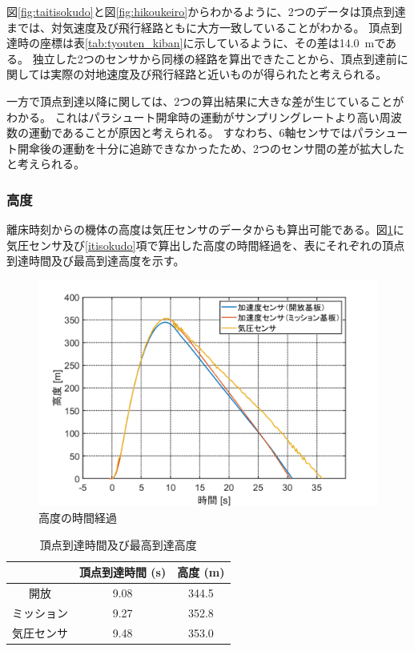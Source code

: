 \documentclass[a4paper,11pt,titlepage,uplatex]{jsarticle}
\begin{document}
図\ref{fig:taitisokudo}と図\ref{fig:hikoukeiro}からわかるように、2つのデータは頂点到達までは、対気速度及び飛行経路ともに大方一致していることがわかる。
頂点到達時の座標は表\ref{tab:tyouten_kiban}に示しているように、その差は\SI{14.0}{m}である。
独立した2つのセンサから同様の経路を算出できたことから、頂点到達前に関しては実際の対地速度及び飛行経路と近いものが得られたと考えられる。

一方で頂点到達以降に関しては、2つの算出結果に大きな差が生じていることがわかる。
これはパラシュート開傘時の運動がサンプリングレートより高い周波数の運動であることが原因と考えられる。
すなわち、6軸センサではパラシュート開傘後の運動を十分に追跡できなかったため、2つのセンサ間の差が拡大したと考えられる。

\subsubsection{高度}
\label{koudo}
離床時刻からの機体の高度は気圧センサのデータからも算出可能である。図\ref{fig:koudozikannkeika}に気圧センサ及び\ref{itisokudo}項で算出した高度の時間経過を、表にそれぞれの頂点到達時間及び最高到達高度を示す。

\begin{figure}[H]
    \centering
    \includegraphics[width=0.7\linewidth]{pic_sim/pos_h.png}
    \caption{高度の時間経過}
    \label{fig:koudozikannkeika}
\end{figure}

\begin{table}[H]
    \centering
    \caption{頂点到達時間及び最高到達高度}
    \label{tab:tyouten}
    \begin{tabular}{ccc}
        \hline
              & 頂点到達時間 (\si{s}) & 高度 (\si{m}) \\\hline
        開放    & 9.08            & 344.5       \\
        ミッション & 9.27            & 352.8       \\
        気圧センサ & 9.48            & 353.0       \\
        \hline
    \end{tabular}
\end{table}
\end{document}
